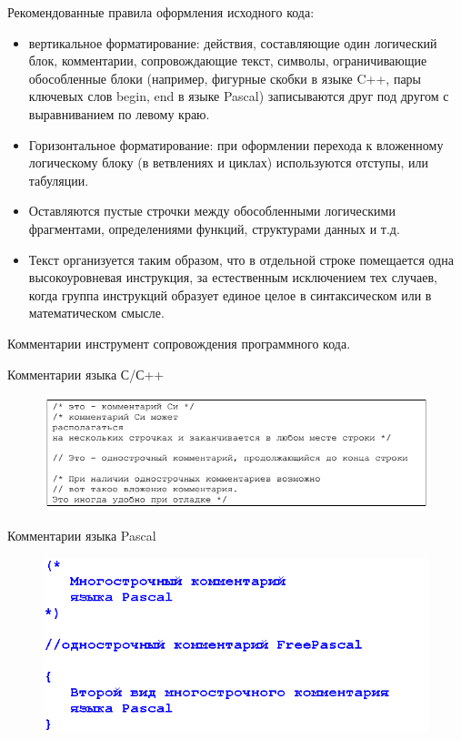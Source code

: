 \documentclass{beamer}
\begin{document}
\begin{frame}
Рекомендованные правила оформления исходного кода:
\begin{itemize}
\item вертикальное форматирование: действия, составляющие один
логический блок, комментарии, сопровождающие текст, символы,
ограничивающие обособленные блоки (например, фигурные
скобки в языке C++, пары ключевых слов begin, end в языке Pascal)
записываются друг под другом с выравниванием по левому краю.
\item Горизонтальное форматирование: при оформлении перехода к
вложенному логическому блоку (в ветвлениях и циклах)
используются отступы, или табуляции.
\item Оставляются пустые строчки между обособленными логическими
фрагментами, определениями функций, структурами данных и т.д.
\item Текст организуется таким образом, что в
отдельной строке помещается одна высокоуровневая инструкция,
за естественным исключением тех случаев, когда группа
инструкций образует единое целое в синтаксическом или в
математическом смысле.
\end{itemize}
\end{frame}

\begin{frame}
\begin{block}{Комментарии}
инструмент сопровождения программного кода. 
\end{block}
Комментарии языка С/С++
\begin{figure}[h]
\centering
\includegraphics[scale=0.5]{images/lec01-pic18.png}
\end{figure}
Комментарии языка Pascal
\begin{figure}[h]
\centering
\includegraphics[scale=0.4]{images/lec01-pic19.png}
\end{figure}
\end{frame}
\end{document}
